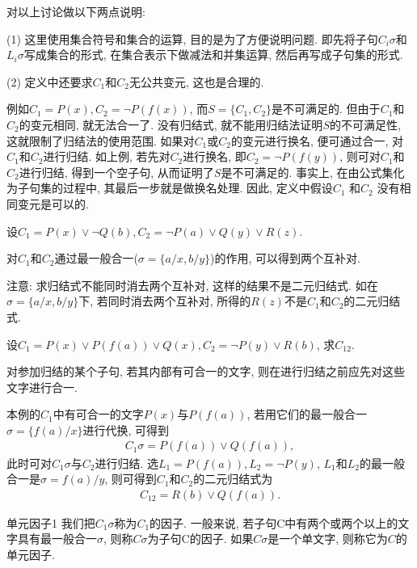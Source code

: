 对以上讨论做以下两点说明:

(1) 这里使用集合符号和集合的运算, 目的是为了方便说明问题. 即先将子句$C_i\sigma$和$L_i\sigma$写成集合的形式, 在集合表示下做减法和并集运算, 然后再写成子句集的形式.

(2) 定义中还要求$C_1$和$C_2$无公共变元, 这也是合理的.
\begin{example}
例如$C_1=P(x), C_2=\neg P(f(x))$, 而$S=\{C_1,  C_2\}$是不可满足的. 但由于$C_1$和$C_2$的变元相同, 就无法合一了. 没有归结式, 就不能用归结法证明$S$的不可满足性, 这就限制了归结法的使用范围.
如果对$C_1$或$C_2$的变元进行换名, 便可通过合一, 对$C_1$和$C_2$进行归结. 如上例, 若先对$C_2$进行换名, 即$C_2=\neg P(f(y))$, 则可对$C_1$和$C_2$进行归结, 得到一个空子句, 从而证明了$S$是不可满足的.
事实上, 在由公式集化为子句集的过程中, 其最后一步就是做换名处理. 因此, 定义中假设$C_1$ 和$C_2$ 没有相同变元是可以的.
\end{example}
\begin{example}
  设$C_1=P(x)\vee \neg Q(b), C_2=\neg P(a)\vee Q(y)\vee R(z)$.
\end{example}
\begin{result}
  对$C_1$和$C_2$通过最一般合一($\sigma =\{a/x, b/y\}$)的作用, 可以得到两个互补对.
\end{result}
\begin{remark}
注意: 求归结式不能同时消去两个互补对, 这样的结果不是二元归结式. 如在$\sigma =\{a/x, b/y\}$下, 若同时消去两个互补对, 所得的$R(z)$不是$C_1$和$C_2$的二元归结式.
\end{remark}

\begin{example}
  设$C_1=P(x)\vee P(f(a))\vee Q(x) , C_2=\neg P(y)\vee R(b)$, 求$C_{1 2}$.
\end{example}
\begin{result}
对参加归结的某个子句, 若其内部有可合一的文字, 则在进行归结之前应先对这些文字进行合一.

本例的$C_1$中有可合一的文字$P(x)$与$P(f(a))$, 若用它们的最一般合一$\sigma =\{f(a)/x\}$进行代换, 可得到
\begin{align}
    C_1\sigma =P(f(a))\vee Q(f(a)),
\end{align}
此时可对$C_1\sigma$与$C_2$进行归结. 选$L_1= P(f(a)), L_2 =\neg P(y)$, $L_1$和$L_2$的最一般合一是$\sigma={f(a)/y}$, 则可得到$C_1$和$C_2$的二元归结式为
\begin{align}
  C_{12}=R(b)\vee Q(f(a)).
\end{align}
\end{result}
\begin{mydef}{单元因子}{1}
  我们把$C_1\sigma$称为$C_1$的因子. 一般来说, 若子句C中有两个或两个以上的文字具有最一般合一$\sigma$, 则称$C\sigma$为子句C的因子. 如果$C\sigma$是一个单文字, 则称它为$C$的单元因子.
\end{mydef}

